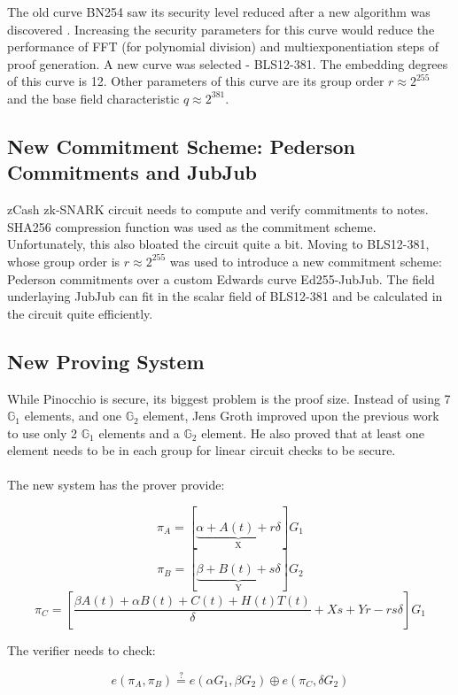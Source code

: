 The old curve BN254 saw its security level reduced after a new algorithm was discovered \cite{zcashbls12381}. Increasing the security parameters for this curve would reduce the performance of FFT (for polynomial division) and multiexponentiation steps of proof generation. A new curve was selected - BLS12-381. The embedding degrees of this curve is 12. Other parameters of this curve are its group order $r \approx 2^{255}$ and the base field characteristic $q \approx 2^{381}$.

\subsection{New Commitment Scheme: Pederson Commitments and JubJub}

zCash zk-SNARK circuit needs to compute and verify commitments to notes. SHA256 compression function was used as the commitment scheme. Unfortunately, this also bloated the circuit quite a bit. Moving to BLS12-381, whose group order is $r \approx 2^{255}$ was used to introduce a new commitment scheme: Pederson commitments over a custom Edwards curve Ed255-JubJub\cite{zcashjubjub}. The field underlaying JubJub can fit in the scalar field of BLS12-381 and be calculated in the circuit quite efficiently.

\subsection{New Proving System}
\label{grothexpl}

While Pinocchio is secure, its biggest problem is the proof size. Instead of using 7 $\mathbb{G}_1$ elements, and one $\mathbb{G}_2$ element, Jens Groth\cite{groth2016size} improved upon the previous work to use only 2 $\mathbb{G}_1$ elements and a $\mathbb{G}_2$ element. He also proved that at least one element needs to be in each group for linear circuit checks to be secure.\\
\\
The new system has the prover provide:

$$ \pi_A = [\underbrace{\alpha + A(t) + r\delta}_\text{X}]G_1 $$
$$ \pi_B = [\underbrace{\beta + B(t) + s\delta}_\text{Y}]G_2 $$
$$ \pi_C = [\frac{\beta A(t) + \alpha B(t) + C(t) + H(t)T(t)}{\delta} + Xs + Yr - rs\delta]G_1 $$

The verifier needs to check:

$$ e(\pi_A, \pi_B) \stackrel{?}{=} e(\alpha G_1, \beta G_2) \oplus e(\pi_C, \delta G_2) $$

